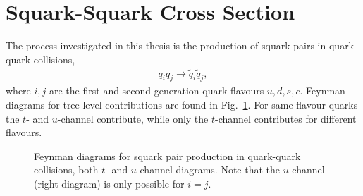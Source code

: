 \documentclass[twoside,english]{uiofysmaster}
\begin{document}
{\section{Squark-Squark Cross Section}
The process investigated in this thesis is the production of squark pairs in quark-quark collisions,
\begin{align}
q_i q_j \rightarrow \widetilde{q}_i \widetilde{q}_j,
\end{align}
where $i,j$ are the first and second generation quark flavours $u, d, s, c$. Feynman diagrams for tree-level contributions are found in Fig.\ \ref{Fig:: susy hadron : Feynman qq}. For same flavour quarks the $t$- and $u$-channel contribute, while only the $t$-channel contributes for different flavours. 

\begin{figure}
\centering
{}
\caption{Feynman diagrams for squark pair production in quark-quark collisions, both $t$- and $u$-channel diagrams. Note that the $u$-channel (right diagram) is only possible for $i=j$.}
\label{Fig:: susy hadron : Feynman qq}
\end{figure}



}
\end{document}
